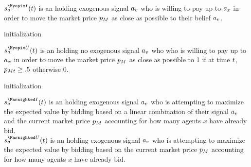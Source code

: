 $\AgentStrategy^{\Myopic\Informed}_\Agent(\Time)$ is an  holding exogenous signal $a_v$ who is willing to pay up to $a_x$ in order to move the market price $p_M$ as close as possible to their belief $a_v$. \\

\begin{algorithm}[H]
\SetAlgoLined
{}
initialization\;
\end{algorithm}

$\AgentStrategy^{\Myopic\Uninformed}_\Agent(\Time)$ is an  holding no exogenous signal $a_v$ who who is willing to pay up to $a_x$ in order to move the market price $p_M$ as close as possible to 1 if at time $t$, $p_{Mt} \ge .5$ otherwise 0. \\

\begin{algorithm}[H]
\SetAlgoLined
{}
initialization\;
\end{algorithm}

$\AgentStrategy^{\Farsighted\Informed}_\Agent(\Time)$ is an holding exogenous signal $a_v$ who is attempting to maximize the expected value by bidding based on a linear combination of their signal $a_v$ and the current market price $p_M$ accounting for how many agents $x$ have already bid. \\

$\AgentStrategy^{\Farsighted\Uninformed}_\Agent(\Time)$ is an  holding exogenous signal $a_v$ who is attempting to maximize the expected value by bidding based on the current market price $p_M$ accounting for how many agents $x$ have already bid. \\
